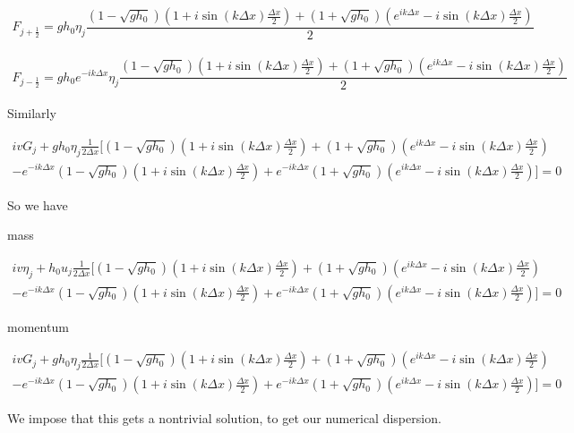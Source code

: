\documentclass[12pt]{article}
\begin{document}
\begin{gather}
F_{j+\frac{1}{2}} = gh_0 \eta_j\dfrac{\left(1 - \sqrt{g h_0}\right)\left(1 + i\sin\left(k \Delta x\right) \frac{\Delta x}{2} \right) + \left(1 + \sqrt{g h_0}\right)\left(e^{ik\Delta x} -  i\sin\left(k \Delta x\right) \frac{\Delta x}{2} \right) }{2}
\end{gather}

\begin{gather}
F_{j-\frac{1}{2}} = gh_0e^{-ik\Delta x} \eta_j\dfrac{\left(1 - \sqrt{g h_0}\right)\left(1 + i\sin\left(k \Delta x\right) \frac{\Delta x}{2} \right) + \left(1 + \sqrt{g h_0}\right)\left(e^{ik\Delta x} -  i\sin\left(k \Delta x\right) \frac{\Delta x}{2} \right) }{2}
\end{gather}

Similarly

\begin{multline}
ivG_j + gh_0 \eta_j  \frac{1}{2\Delta x}[ \left(1 - \sqrt{g h_0}\right)\left(1 + i\sin\left(k \Delta x\right) \frac{\Delta x}{2} \right) + \left(1 + \sqrt{g h_0}\right)\left(e^{ik\Delta x} -  i\sin\left(k \Delta x\right) \frac{\Delta x}{2} \right)
\\-  e^{-ik\Delta x}\left(1 - \sqrt{g h_0}\right)\left(1 + i\sin\left(k \Delta x\right) \frac{\Delta x}{2} \right) +  e^{-ik\Delta x}\left(1 + \sqrt{g h_0}\right)\left(e^{ik\Delta x} -  i\sin\left(k \Delta x\right) \frac{\Delta x}{2} \right) ] = 0
\end{multline}

So we have

mass

\begin{multline}
iv\eta_j + h_0 u_j  \frac{1}{2\Delta x}[ \left(1 - \sqrt{g h_0}\right)\left(1 + i\sin\left(k \Delta x\right) \frac{\Delta x}{2} \right) + \left(1 + \sqrt{g h_0}\right)\left(e^{ik\Delta x} -  i\sin\left(k \Delta x\right) \frac{\Delta x}{2} \right)
\\-  e^{-ik\Delta x}\left(1 - \sqrt{g h_0}\right)\left(1 + i\sin\left(k \Delta x\right) \frac{\Delta x}{2} \right) +  e^{-ik\Delta x}\left(1 + \sqrt{g h_0}\right)\left(e^{ik\Delta x} -  i\sin\left(k \Delta x\right) \frac{\Delta x}{2} \right) ] = 0
\end{multline}

momentum 

\begin{multline}
ivG_j + gh_0 \eta_j  \frac{1}{2\Delta x}[ \left(1 - \sqrt{g h_0}\right)\left(1 + i\sin\left(k \Delta x\right) \frac{\Delta x}{2} \right) + \left(1 + \sqrt{g h_0}\right)\left(e^{ik\Delta x} -  i\sin\left(k \Delta x\right) \frac{\Delta x}{2} \right)
\\-  e^{-ik\Delta x}\left(1 - \sqrt{g h_0}\right)\left(1 + i\sin\left(k \Delta x\right) \frac{\Delta x}{2} \right) +  e^{-ik\Delta x}\left(1 + \sqrt{g h_0}\right)\left(e^{ik\Delta x} -  i\sin\left(k \Delta x\right) \frac{\Delta x}{2} \right) ] = 0
\end{multline}

We impose that this gets a nontrivial solution, to get our numerical dispersion. 
\end{document}
